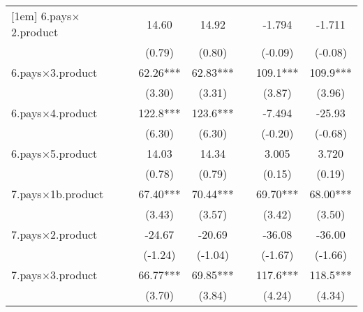 {\begin{tabular}{l*{6}{c}}
[1em]
6.pays$\times$2.product    &                     &       14.60         &       14.92         &                     &      -1.794         &      -1.711         \\
                    &                     &      (0.79)         &      (0.80)         &                     &     (-0.09)         &     (-0.08)         \\
[1em]
6.pays$\times$3.product    &                     &       62.26***&       62.83***&                     &       109.1***&       109.9***\\
                    &                     &      (3.30)         &      (3.31)         &                     &      (3.87)         &      (3.96)         \\
[1em]
6.pays$\times$4.product    &                     &       122.8***&       123.6***&                     &      -7.494         &      -25.93         \\
                    &                     &      (6.30)         &      (6.30)         &                     &     (-0.20)         &     (-0.68)         \\
[1em]
6.pays$\times$5.product    &                     &       14.03         &       14.34         &                     &       3.005         &       3.720         \\
                    &                     &      (0.78)         &      (0.79)         &                     &      (0.15)         &      (0.19)         \\
[1em]
7.pays$\times$1b.product   &                     &       67.40***&       70.44***&                     &       69.70***&       68.00***\\
                    &                     &      (3.43)         &      (3.57)         &                     &      (3.42)         &      (3.50)         \\
[1em]
7.pays$\times$2.product    &                     &      -24.67         &      -20.69         &                     &      -36.08         &      -36.00         \\
                    &                     &     (-1.24)         &     (-1.04)         &                     &     (-1.67)         &     (-1.66)         \\
[1em]
7.pays$\times$3.product    &                     &       66.77***&       69.85***&                     &       117.6***&       118.5***\\
                    &                     &      (3.70)         &      (3.84)         &                     &      (4.24)         &      (4.34)         \\

\end{tabular}}
